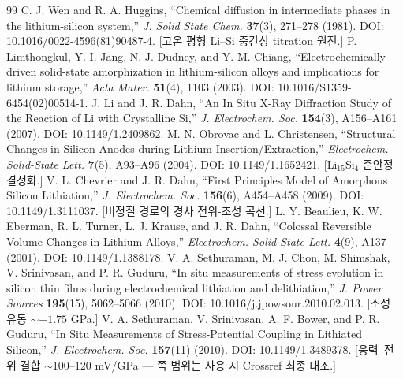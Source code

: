\begin{thebibliography}{99}
 C. J. Wen and R. A. Huggins, ``Chemical diffusion in intermediate phases in the lithium-silicon system,'' \emph{J. Solid State Chem.} \textbf{37}(3), 271--278 (1981). DOI: 10.1016/0022-4596(81)90487-4. [고온 평형 Li--Si 중간상 titration 원전.]
 P. Limthongkul, Y.-I. Jang, N. J. Dudney, and Y.-M. Chiang, ``Electrochemically-driven solid-state amorphization in lithium-silicon alloys and implications for lithium storage,'' \emph{Acta Mater.} \textbf{51}(4), 1103 (2003). DOI: 10.1016/S1359-6454(02)00514-1.
 J. Li and J. R. Dahn, ``An In Situ X-Ray Diffraction Study of the Reaction of Li with Crystalline Si,'' \emph{J. Electrochem. Soc.} \textbf{154}(3), A156--A161 (2007). DOI: 10.1149/1.2409862.
 M. N. Obrovac and L. Christensen, ``Structural Changes in Silicon Anodes during Lithium Insertion/Extraction,'' \emph{Electrochem. Solid-State Lett.} \textbf{7}(5), A93--A96 (2004). DOI: 10.1149/1.1652421. [Li$_{15}$Si$_4$ 준안정 결정화.]
 V. L. Chevrier and J. R. Dahn, ``First Principles Model of Amorphous Silicon Lithiation,'' \emph{J. Electrochem. Soc.} \textbf{156}(6), A454--A458 (2009). DOI: 10.1149/1.3111037. [비정질 경로의 경사 전위-조성 곡선.]
 L. Y. Beaulieu, K. W. Eberman, R. L. Turner, L. J. Krause, and J. R. Dahn, ``Colossal Reversible Volume Changes in Lithium Alloys,'' \emph{Electrochem. Solid-State Lett.} \textbf{4}(9), A137 (2001). DOI: 10.1149/1.1388178.
 V. A. Sethuraman, M. J. Chon, M. Shimshak, V. Srinivasan, and P. R. Guduru, ``In situ measurements of stress evolution in silicon thin films during electrochemical lithiation and delithiation,'' \emph{J. Power Sources} \textbf{195}(15), 5062--5066 (2010). DOI: 10.1016/j.jpowsour.2010.02.013. [소성 유동 $\sim-1.75$ GPa.]
 V. A. Sethuraman, V. Srinivasan, A. F. Bower, and P. R. Guduru, ``In Situ Measurements of Stress-Potential Coupling in Lithiated Silicon,'' \emph{J. Electrochem. Soc.} \textbf{157}(11) (2010). DOI: 10.1149/1.3489378. [응력--전위 결합 $\sim100$--$120$ mV/GPa --- 쪽 범위는 사용 시 Crossref 최종 대조.]

\end{thebibliography}
